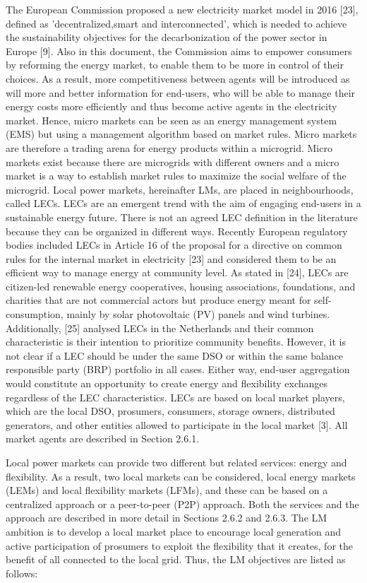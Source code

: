 The European Commission proposed a new electricity market model in 2016 [23], defined as 'decentralized,smart and interconnected', which is needed to achieve the sustainability objectives for the decarbonization of the power sector in Europe [9]. Also in this document, the Commission aims to empower consumers by reforming the energy market, to enable them to be more in control of their choices. As a result, more competitiveness between agents will be introduced as will more and better information for end-users, who will be able to manage their energy costs more efficiently and thus become active agents in the electricity market.
Hence, micro markets can be seen as an energy management system (EMS) but using a management algorithm based on market rules. Micro markets are therefore a trading arena for energy products within a microgrid. Micro markets exist because there are microgrids with different owners and a micro market is a way to establish market rules to maximize the social welfare of the microgrid.
Local power markets, hereinafter LMs, are placed in neighbourhoods, called LECs. LECs are an emergent trend with the aim of engaging end-users in a sustainable energy future. There is not an agreed LEC definition in the literature because they can be organized in different ways. Recently European regulatory bodies included LECs in Article 16 of the proposal for a directive on common rules for the internal market in electricity [23] and considered them to be an efficient way to manage energy at community level. 
As stated in [24], LECs are citizen-led renewable energy cooperatives, housing associations, foundations, and charities that are not commercial actors but produce energy meant for self-consumption, mainly by solar photovoltaic (PV) panels and wind turbines. Additionally, [25] analysed LECs in the Netherlands and their common characteristic is their intention to prioritize community benefits. However, it is not clear if a LEC should be under the same DSO or within the same balance responsible party (BRP) portfolio in all cases. Either way, end-user aggregation would constitute an opportunity to create energy and flexibility exchanges regardless of the LEC characteristics. LECs are based on local market players, which are the local DSO, prosumers, consumers, storage owners, distributed generators, and other entities allowed to participate in the local market [3]. All market agents are described in Section 2.6.1.

Local power markets can provide two different but related services: energy and flexibility. As a result, two local markets can be considered, local energy markets (LEMs) and local flexibility markets (LFMs), and these can be based on a centralized approach or a peer-to-peer (P2P) approach. Both the services and the approach are described in more detail in Sections 2.6.2 and 2.6.3. The LM ambition is to develop a local market place to encourage local generation and active participation of prosumers to exploit the flexibility that it creates, for the benefit of all connected to the local grid. Thus, the LM objectives are listed as follows:

